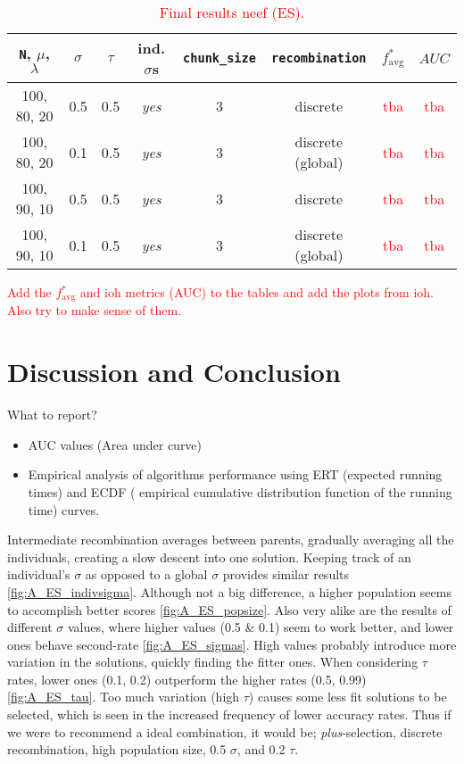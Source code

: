 \documentclass{article}
\newcommand{\todo}[1]{\textcolor{red}{#1}}
\begin{document}
\begin{table}[htbp]
    \centering
    \begin{tabular}{cccccc|cc}
        \toprule
        \texttt{N}, $\mu$, $\lambda$ & $\sigma$ & $\tau$ & ind. $\sigma$s & \texttt{chunk\_size} & \texttt{recombination}
            & $f^*_{\mathrm{avg}}$ & $AUC$ \\ %
        \midrule
        100, 80, 20  &  0.5  &  0.5  &  \textit{yes}  &  3  & discrete           &  \todo{tba}  &  \todo{tba}  \\
        100, 80, 20  &  0.1  &  0.5  &  \textit{yes}  &  3  & discrete (global)  &  \todo{tba}  &  \todo{tba}  \\
        100, 90, 10  &  0.5  &  0.5  &  \textit{yes}  &  3  & discrete           &  \todo{tba}  &  \todo{tba}  \\
        100, 90, 10  &  0.1  &  0.5  &  \textit{yes}  &  3  & discrete (global)  &  \todo{tba}  &  \todo{tba}  \\
        \bottomrule
    \end{tabular}
    \vspace{0.1cm}
    \caption{\todo{Final results neef (ES).}}
    \label{tab:ES_final_configs}
\end{table}


\todo{Add the $f^*_{\mathrm{avg}}$ and ioh metrics (AUC) to the tables and add the plots from ioh. Also try to make sense of them.}

\section{Discussion and Conclusion}
\label{sec:disres}

What to report? 
\begin{itemize}
    \item AUC values (Area under curve) 
    \item Empirical analysis of algorithms performance using ERT (expected running times) and ECDF ( empirical cumulative distribution function of the running time) curves. 
\end{itemize}

Intermediate recombination averages between parents, gradually averaging all the individuals, creating a slow descent into one solution.  
Keeping track of an individual's $\sigma$ as opposed to a global $\sigma$ provides similar results \ref{fig:A_ES_indivsigma}.
Although not a big difference, a higher population seems to accomplish better scores \ref{fig:A_ES_popsize}. 
Also very alike are the results of different $\sigma$ values, where higher values (0.5 \& 0.1) seem to work better, and lower ones behave second-rate \ref{fig:A_ES_sigmas}. 
High values probably introduce more variation in the solutions, quickly finding the fitter ones.
When considering $\tau$ rates, lower ones (0.1, 0.2) outperform the higher rates (0.5, 0.99) \ref{fig:A_ES_tau}.
Too much variation (high $\tau$) causes some less fit solutions to be selected, which is seen in the increased frequency of lower accuracy rates.
Thus if we were to recommend a ideal combination, it would be; \textit{plus}-selection, discrete recombination, high population size, 0.5 $\sigma$, and 0.2 $\tau$. 
\end{document}
